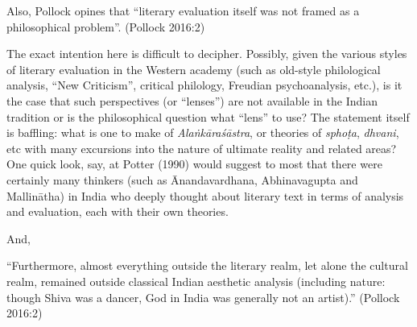 \newpage

Also, Pollock opines that “literary evaluation itself was not framed as a philosophical problem”. (Pollock 2016:2)

The exact intention here is difficult to decipher. Possibly, given the various styles of literary evaluation in the Western academy (such as old-style philological analysis, “New Criticism”, critical philology, Freudian psychoanalysis, etc.), is it the case that such perspectives (or “lenses”) are not available in the Indian tradition or is the philosophical question what “lens” to use? The statement itself is baffling: what is one to make of \textsl{Alaṅkāraśāstra}, or theories of \textsl{sphoṭa}, \textsl{dhvani}, etc with many excursions into the nature of ultimate reality and related areas? One quick look, say, at Potter (1990) would suggest to most that there were certainly many thinkers (such as Ānandavardhana, Abhinavagupta and Mallinātha) in India who deeply thought about literary text in terms of analysis and evaluation, each with their own theories.

And, 

\begin{myquote}
“Furthermore, almost everything outside the literary realm, let alone the cultural realm, remained outside classical Indian aesthetic analysis (including nature: though Shiva was a dancer, God in India was generally not an artist).” \hfill (Pollock 2016:2)
\end{myquote}

